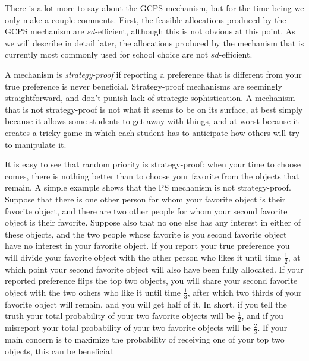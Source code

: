 \documentclass[12pt]{article}
\theoremstyle{definition}
\begin{document}
There is a lot more to say about the GCPS mechanism, but for the time
being we only make a couple comments.  First, the feasible allocations
produced by the GCPS mechanism are $sd$-efficient, although this is
not obvious at this point.  As we will describe in detail later, the
allocations produced by the mechanism that is currently most commonly
used for school choice are not $sd$-efficient.

A mechanism is \emph{strategy-proof} if reporting a preference that is
different from your true preference is never beneficial.
Strategy-proof mechanisms are seemingly straightforward, and don't
punish lack of strategic sophistication.  A mechanism that is not
strategy-proof is not what it seems to be on its surface, at best
simply because it allows some students to get away with things, and at
worst because it creates a tricky game in which each student has to
anticipate how others will try to manipulate it.

It is easy to see that random priority is strategy-proof: when your
time to choose comes, there is nothing better than to choose your
favorite from the objects that remain.  A simple example shows that
the PS mechanism is not strategy-proof.  Suppose that there is one
other person for whom your favorite object is their favorite object,
and there are two other people for whom your second favorite object is
their favorite.  Suppose also that no one else has any interest in
either of these objects, and the two people whose favorite is you
second favorite object have no interest in your favorite object.  If
you report your true preference you will divide your favorite object
with the other person who likes it until time $\tfrac12$, at which
point your second favorite object will also have been fully allocated.
If your reported preference flips the top two objects, you will share
your second favorite object with the two others who like it until time
$\tfrac13$, after which two thirds of your favorite object will
remain, and you will get half of it.  In short, if you tell the truth
your total probability of your two favorite objects will be
$\tfrac12$, and if you misreport your total probability of your two
favorite objects will be $\tfrac23$.  If your main concern is to
maximize the probability of receiving one of your top two objects,
this can be beneficial.
\end{document}
